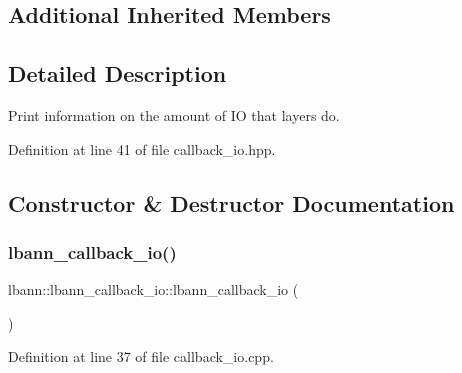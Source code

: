 \subsection*{Additional Inherited Members}


\subsection{Detailed Description}
Print information on the amount of IO that layers do. 

Definition at line 41 of file callback\+\_\+io.\+hpp.



\subsection{Constructor \& Destructor Documentation}
\mbox{\label{classlbann_1_1lbann__callback__io_a12c89d246c657ca588d3fb637ef79183}} 
\subsubsection{\texorpdfstring{lbann\+\_\+callback\+\_\+io()}{lbann\_callback\_io()}\hspace{0.1cm}{\footnotesize\ttfamily [1/3]}}
{\footnotesize\ttfamily lbann\+::lbann\+\_\+callback\+\_\+io\+::lbann\+\_\+callback\+\_\+io (\begin{DoxyParamCaption}{ }\end{DoxyParamCaption})}



Definition at line 37 of file callback\+\_\+io.\+cpp.


